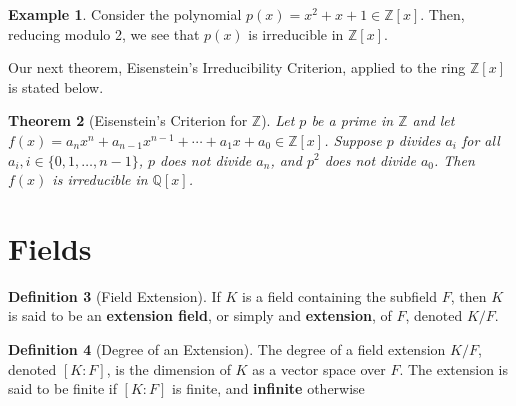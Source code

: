 \documentclass[10pt, oneside, reqno]{amsart}
\theoremstyle{plain}%
\newtheorem{thm}{Theorem}[section]
\theoremstyle{definition}
\newtheorem{defn}[thm]{Definition}
\newtheorem{exmp}[thm]{Example}
\theoremstyle{remark}
\newcommand{\Q}{\mathbb{Q}}
\newcommand{\Z}{\mathbb{Z}}
\newcommand{\xdeg}[2]{[#1 : #2]}
\begin{document}
\begin{exmp}
    Consider the polynomial $p(x) = x^2 + x + 1 \in \Z[x]$.  Then, reducing modulo 2, we see that $p(x)$ is irreducible in $\Z[x]$.
\end{exmp}

Our next theorem, Eisenstein's Irreducibility Criterion, applied to the ring $\Z[x]$ is stated below.

\begin{thm}[Eisenstein's Criterion for $\Z$]
    
    Let $p$ be a prime in $\Z$ and let $f(x) = a_n x^n + a_{n-1}x^{n-1} + \cdots + a_1 x + a_0 \in \Z[x]$. Suppose $p$ divides $a_i$ for all $a_i, i \in \{0, 1, \dots, n-1 \}$, $p$ does not divide $a_n$, and $p^2$ does not divide $a_0$.  Then $f(x)$ is irreducible in $\Q[x]$.
\end{thm}




\section{Fields} %

\label{sec:fields}

\begin{defn}[Field Extension]
    If $K$ is a field containing the subfield $F$, then $K$ is said to be an \textbf{extension field}, or simply and \textbf{extension}, of $F$, denoted $K/F$.  
\end{defn}

\begin{defn}[Degree of an Extension]
    The degree of a field extension $K/F$, denoted $\xdeg{K}{F}$, is the dimension of $K$ as a vector space over $F$.  The extension is said to be finite if $\xdeg{K}{F}$ is finite, and \textbf{infinite} otherwise
\end{defn}
\end{document}
